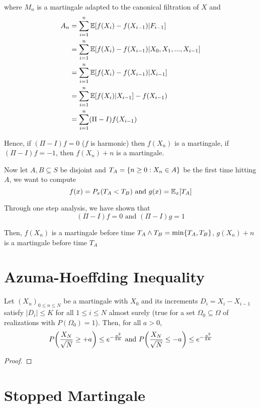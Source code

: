 \documentclass{report}
\begin{document}
where $M_n$ is a martingale adapted to the canonical filtration of $X$ and
\begin{align*}
	A_n
	&= \sum_{i=1}^n \mathbb{E}[f(X_i) - f(X_{i-1}) | F_{i-1}] \\
	&= \sum_{i=1}^n \mathbb{E}[f(X_i) - f(X_{i-1}) | X_0, X_1, ..., X_{i-1}] \\
	&= \sum_{i=1}^n \mathbb{E}[f(X_i) - f(X_{i-1}) | X_{i-1}] \\
	&= \sum_{i=1}^n \mathbb{E}[f(X_i)| X_{i-1}] - f(X_{i-1}) \\
	&= \sum_{i=1}^n (\Pi - I) f (X_{i-1}) \\
\end{align*}

Hence, if $(\Pi - I) f = 0$ ($f$ is harmonic) then $f(X_n)$ is a martingale, if $(\Pi - I) f = -1$, then $f(X_n) + n$ is a martingale. 

Now let $A, B \subseteq S$ be disjoint and $T_A = \{n \geq 0: X_n \in A\}$ be the first time hitting $A$, we want to compute
$$
	f(x) = P_x(T_A < T_B) \text{ and } g(x) = \mathbb{E}_x[T_A]
$$

Through one step analysis, we have shown that
$$
	(\Pi - I) f = 0 \text{ and } (\Pi - I) g = 1
$$

Then, $f(X_n)$ is a martingale before time $T_A \wedge T_B = \min\{T_A, T_B\}$, $g(X_n) + n$ is a martingale before time $T_A$

\section{Azuma-Hoeffding Inequality}

\begin{theorem}
	Let $(X_n)_{0 \leq n \leq N}$ be a martingale with $X_0$ and its increments $D_i = X_i - X_{i-1}$ satisfy $|D_i| \leq K$ for all $1 \leq i \leq N$ almost surely (true for a set $\Omega_0 \subseteq \Omega$ of realizations with $P(\Omega_0) = 1$). Then, for all $a > 0$,
	$$
		P\tuple*{\frac{X_N}{\sqrt{N}} \geq + a} \leq e^{- \frac{a^2}{2K}} \text{ and } P\tuple*{\frac{X_N}{\sqrt{N}} \leq - a} \leq e^{- \frac{a^2}{2K}}
	$$
\begin{proof}
\end{proof}
\end{theorem}



\section{Stopped Martingale}
\end{document}
